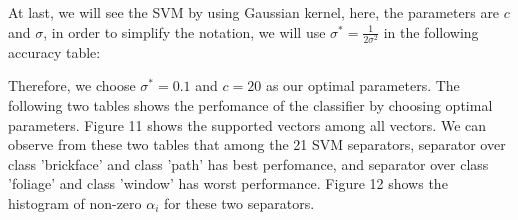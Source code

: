 \documentclass{article}
\begin{document}
At last, we will see the SVM by using Gaussian kernel, here, the parameters are $c$ and $\sigma$, in order to simplify the notation, we will use $\sigma^{*} = \frac{1}{2\sigma^{2}}$ in the following accuracy table:


Therefore, we choose $\sigma^{*}=0.1$ and $c=20$ as our optimal parameters. The following two tables shows the perfomance of the classifier by choosing optimal parameters. Figure 11 shows the supported vectors among all vectors. We can observe from these two tables that among the 21 SVM separators, separator over class 'brickface' and class 'path' has best perfomance, and separator over class 'foliage' and class 'window' has worst performance. Figure 12 shows the histogram of non-zero $\alpha_{i}$ for these two separators. 
\end{document}
